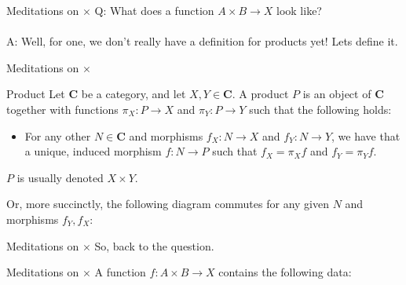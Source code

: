 \documentclass[tikz]{beamer}
\theoremstyle{definition}
\begin{document}
\begin{frame}{Meditations on $\times$}
    Q: What does a function $A \times B \to X$ look like? 
    \\
    \\
    A: Well, for one, we don't really have a definition for products yet! Lets define it. 
\end{frame}{}

\begin{frame}{Meditations on $\times$}
    \begin{definition}{Product}
        Let $\mathbf{C}$ be a category, and let $X, Y \in \mathbf{C}$. A product $P$ is an object of $\mathbf{C}$ together with functions $\pi_X: P \to X$ and $\pi_Y: P \to Y$ such that the following holds:  
            \begin{itemize}
                \item For any other $N \in \mathbf{C}$ and morphisms $f_X: N \to X$ and $f_Y : N \to Y$, we have that a unique, induced morphism $f : N \to P$ such that $f_X = \pi_Xf$ and $f_Y = \pi_Yf$. 
            \end{itemize}
    \end{definition}
    $P$ is usually denoted $X \times Y$.
\end{frame}{}

\begin{frame}[fragile]
    Or, more succinctly, the following diagram commutes for any given $N$ and morphisms $f_Y, f_X$: 
    
\begin{center}
    {}
\end{center}{}

\end{frame}

\begin{frame}{Meditations on $\times$}
    So, back to the question.
\end{frame}{}

\begin{frame}{Meditations on $\times$}
    A function $f: A \times B \to X$ contains the following data: 
\end{frame}{}
\end{document}
